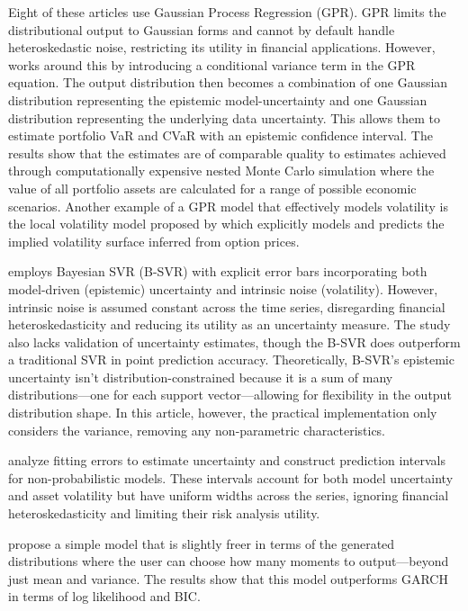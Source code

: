 Eight of these articles use Gaussian Process Regression (GPR). GPR limits the distributional output to Gaussian forms and cannot by default handle heteroskedastic noise, restricting its utility in financial applications. However, \textcite{Risk2018gpr} works around this by introducing a conditional variance term in the GPR equation. The output distribution then becomes a combination of one Gaussian distribution representing the epistemic model-uncertainty and one Gaussian distribution representing the underlying data uncertainty. This allows them to estimate portfolio VaR and CVaR with an epistemic confidence interval. The results show that the estimates are of comparable quality to estimates achieved through computationally expensive nested Monte Carlo simulation where the value of all portfolio assets are calculated for a range of possible economic scenarios. Another example of a GPR model that effectively models volatility is the local volatility model proposed by \textcite{tegner2021probabilistic} which explicitly models and predicts the implied volatility surface inferred from option prices.

\textcite{Law2017Practical} employs Bayesian SVR (B-SVR) with explicit error bars incorporating both model-driven (epistemic) uncertainty and intrinsic noise (volatility). However, intrinsic noise is assumed constant across the time series, disregarding financial heteroskedasticity and reducing its utility as an uncertainty measure. The study also lacks validation of uncertainty estimates, though the B-SVR does outperform a traditional SVR in point prediction accuracy. Theoretically, B-SVR's epistemic uncertainty isn't distribution-constrained because it is a sum of many distributions—one for each support vector—allowing for flexibility in the output distribution shape. In this article, however, the practical implementation only considers the variance, removing any non-parametric characteristics.

\textcite{Tian2023} analyze fitting errors to estimate uncertainty and construct prediction intervals for non-probabilistic models. These intervals account for both model uncertainty and asset volatility but have uniform widths across the series, ignoring financial heteroskedasticity and limiting their risk analysis utility.

\textcite{Horenko2020} propose a simple model that is slightly freer in terms of the generated distributions where the user can choose how many moments to output—beyond just mean and variance. The results show that this model outperforms GARCH in terms of log likelihood and BIC.

